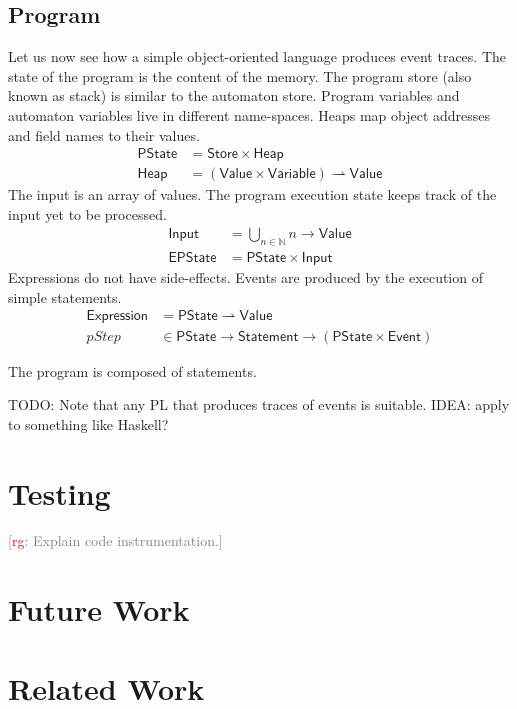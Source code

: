 \documentclass[preprint]{sigplanconf} %
\newcommand{\note}[2]{\textcolor{gray}{[\textcolor{red}{#1}: #2]}}
\newcommand{\rg}[1]{\note{rg}{#1}}
\newcommand{\N}{\ensuremath{\mathbb{N}}}
\newcommand{\pmap}{\rightharpoonup}
\newcommand{\set}[1]{\ensuremath{\mathsf{#1}}}
\theoremstyle{definition}
\begin{document}
\subsection{Program} %

Let us now see how a simple object-oriented language produces event traces.
The state of the program is the content of the memory.
The program store (also known as stack) is similar to the automaton store.
Program variables and automaton variables live in different name-spaces.
Heaps map object addresses and field names to their values.
\begin{align}
\set{PState}&=\set{Store}\times\set{Heap}\\
\set{Heap}&=(\set{Value}\times\set{Variable})\pmap\set{Value}
\end{align}
The input is an array of values.
The program execution state keeps track of the input yet to be processed.
\begin{align}
\set{Input}&=\bigcup_{n\in\N}n\to\set{Value}\\
\set{EPState}&=\set{PState}\times\set{Input}
\end{align}
Expressions do not have side-effects.
Events are produced by the execution of simple statements.
\begin{align}
\set{Expression}&=\set{PState}\pmap\set{Value} \\
\mathit{pStep}&\in\set{PState}\to\set{Statement}\to(\set{PState}\times\set{Event})
\end{align}


The program is composed of statements.



TODO: Note that any PL that produces traces of events is suitable.
IDEA: apply to something like Haskell?

\section{Testing}\label{sec:testing} %

\rg{Explain code instrumentation.}


\section{Future Work}\label{sec:future} %

\section{Related Work}\label{sec:related} %
\end{document}
